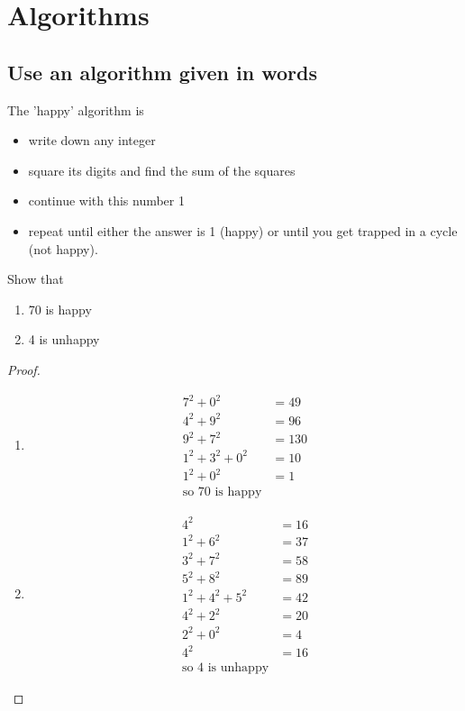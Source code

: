 \documentclass[a4paper]{article}
\begin{document}
\maketitle

\tableofcontents

\section{Algorithms}
\subsection{Use an algorithm given in words}
\begin{eg}
	The 'happy' algorithm is
	\begin{itemize}
		\item write down any integer
		\item square its digits and find the sum of the squares
		\item continue with this number
		      1		\item repeat until either the answer is 1 (happy) or until you get trapped in a cycle (not happy).
	\end{itemize}
	Show that
	\begin{enumerate}
		\item 70 is happy
		\item 4 is unhappy
	\end{enumerate}
	\begin{proof}
		\begin{enumerate}
			\item \begin{align*} 7^2+0^2&=49 \\ 4^2+9^2 &= 96 \\ 9^2+7^2 &= 130 \\ 1^2+3^2 + 0^2 &=10 \\1^2 +0^2 &=1 \\ \text{so 70 is happy} \end{align*}
			\item  \begin{align*} 4^2 &=16 \\ 1^2+6^2 &=37 \\ 3^2+7^2 &= 58 \\ 5^2+8^2 &= 89 \\ 1^2+4^2+5^2 &= 42 \\ 4^2+2^2 &= 20 \\ 2^2+0^2 &= 4 \\ 4^2 &=16 \\ \text{so 4 is unhappy} \end{align*}
		\end{enumerate}
	\end{proof}
\end{eg}
\end{document}
